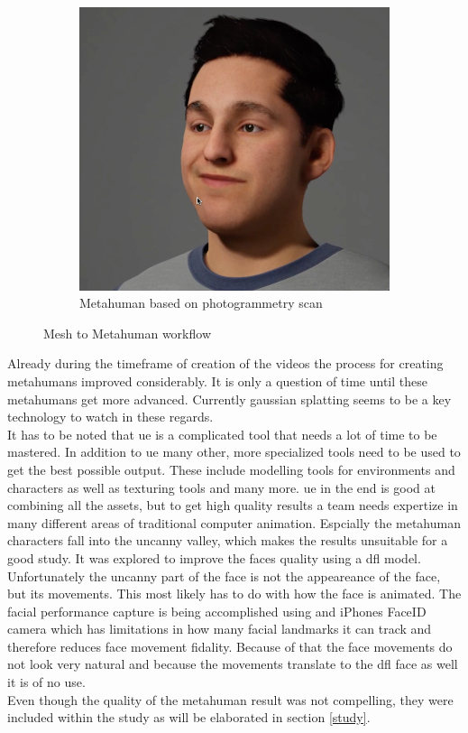 \documentclass[
  a4paper,  %
  twoside,  %
  bibliography=totoc,
  headsepline,
  cleardoublepage=empty,
  parskip=half,
  draft=false
]{scrbook}
\begin{document}
\begin{figure}[h]
\begin{subfigure}[b]{0.5\textwidth}
    \includegraphics[width=\textwidth]{./graphics/images/Metahuman.png}
    \caption{Metahuman based on photogrammetry scan}
  \end{subfigure}
  \caption{Mesh to Metahuman workflow}
  \label{fig:metahuman-comp}
\end{figure}

Already during the timeframe of creation of the videos the process for creating metahumans improved considerably. It is only a question of time until these metahumans get more advanced. Currently gaussian splatting seems to be a key technology to watch in these regards. \\
It has to be noted that \gls{ue} is a complicated tool that needs a lot of time to be mastered. In addition to \gls{ue} many other, more specialized tools need to be used to get the best possible output. These include modelling tools for environments and characters as well as texturing tools and many more. \gls{ue} in the end is good at combining all the assets, but to get high quality results a team needs expertize in many different areas of traditional computer animation. Espcially the metahuman characters fall into the uncanny valley, which makes the results unsuitable for a good study. It was explored to improve the faces quality using a \gls{dfl} model. Unfortunately the uncanny part of the face is not the appeareance of the face, but its movements. This most likely has to do with how the face is animated. The facial performance capture is being accomplished using and iPhones FaceID camera which has limitations in how many facial landmarks it can track and therefore reduces face movement fidality. Because of that the face movements do not look very natural and because the movements translate to the \gls{dfl} face as well it is of no use. \\
Even though the quality of the metahuman result was not compelling, they were included  within the study as will be elaborated in section \ref{study}. 
\end{document}
